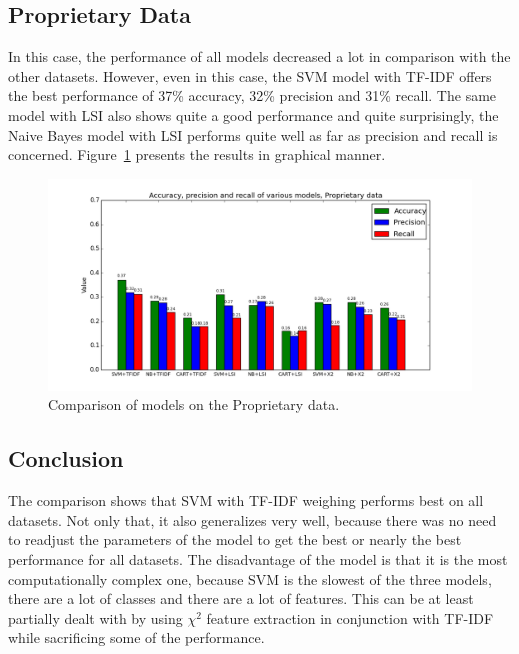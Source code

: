 \subsection{Proprietary Data}

In this case, the performance of all models decreased a lot in comparison with the other datasets. However, even in this case, the SVM model with TF-IDF offers the best performance of 37\% accuracy, 32\% precision and 31\% recall. The same model with LSI also shows quite a good performance and quite surprisingly, the Naive Bayes model with LSI performs quite well as far as precision and recall is concerned. Figure~\ref{fig:results.models.proprietary} presents the results in graphical manner.

\begin{figure}[htbp]
    \centering
        \includegraphics[width=\textwidth]{./images/comparison_of_models/proprietary.png}
    \caption{Comparison of models on the Proprietary data.}
    \label{fig:results.models.proprietary}
\end{figure}

\subsection{Conclusion}

The comparison shows that SVM with TF-IDF weighing performs best on all datasets. Not only that, it also generalizes very well, because there was no need to readjust the parameters of the model to get the best or nearly the best performance for all datasets. The disadvantage of the model is that it is the most computationally complex one, because SVM is the slowest of the three models, there are a lot of classes and there are a lot of features. This can be at least partially dealt with by using $\chi^2$ feature extraction in conjunction with TF-IDF while sacrificing some of the performance.

